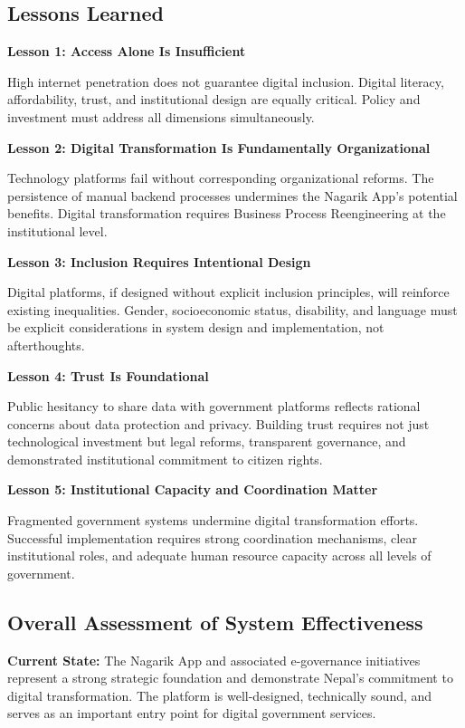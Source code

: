 \documentclass[12pt,a4paper]{article}
\begin{document}
\subsection{Lessons Learned}

\textbf{Lesson 1: Access Alone Is Insufficient}

High internet penetration does not guarantee digital inclusion. Digital literacy, affordability, trust, and institutional design are equally critical. Policy and investment must address all dimensions simultaneously.

\textbf{Lesson 2: Digital Transformation Is Fundamentally Organizational}

Technology platforms fail without corresponding organizational reforms. The persistence of manual backend processes undermines the Nagarik App's potential benefits. Digital transformation requires Business Process Reengineering at the institutional level.

\textbf{Lesson 3: Inclusion Requires Intentional Design}

Digital platforms, if designed without explicit inclusion principles, will reinforce existing inequalities. Gender, socioeconomic status, disability, and language must be explicit considerations in system design and implementation, not afterthoughts.

\textbf{Lesson 4: Trust Is Foundational}

Public hesitancy to share data with government platforms reflects rational concerns about data protection and privacy. Building trust requires not just technological investment but legal reforms, transparent governance, and demonstrated institutional commitment to citizen rights.

\textbf{Lesson 5: Institutional Capacity and Coordination Matter}

Fragmented government systems undermine digital transformation efforts. Successful implementation requires strong coordination mechanisms, clear institutional roles, and adequate human resource capacity across all levels of government.

\subsection{Overall Assessment of System Effectiveness}

\textbf{Current State:} The Nagarik App and associated e-governance initiatives represent a strong strategic foundation and demonstrate Nepal's commitment to digital transformation. The platform is well-designed, technically sound, and serves as an important entry point for digital government services.
\end{document}
